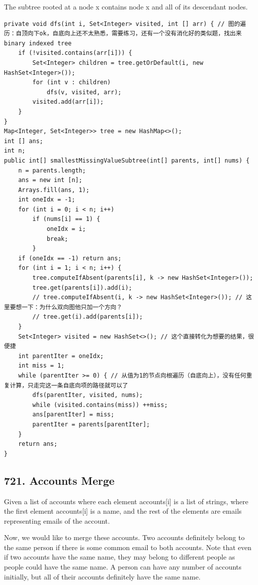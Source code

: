 \documentclass[9pt, b5paper]{article}
\begin{document}
The subtree rooted at a node x contains node x and all of its descendant nodes.
\begin{verbatim}
private void dfs(int i, Set<Integer> visited, int [] arr) { // 图的遍历：自顶向下ok，自底向上还不太熟悉，需要练习，还有一个没有消化好的类似题，找出来binary indexed tree
    if (!visited.contains(arr[i])) {
        Set<Integer> children = tree.getOrDefault(i, new HashSet<Integer>());
        for (int v : children) 
            dfs(v, visited, arr);
        visited.add(arr[i]);
    }
}
Map<Integer, Set<Integer>> tree = new HashMap<>();
int [] ans;
int n;
public int[] smallestMissingValueSubtree(int[] parents, int[] nums) {
    n = parents.length;
    ans = new int [n];
    Arrays.fill(ans, 1); 
    int oneIdx = -1;
    for (int i = 0; i < n; i++) 
        if (nums[i] == 1) {
            oneIdx = i;
            break;
        }
    if (oneIdx == -1) return ans;
    for (int i = 1; i < n; i++) {
        tree.computeIfAbsent(parents[i], k -> new HashSet<Integer>());
        tree.get(parents[i]).add(i);
        // tree.computeIfAbsent(i, k -> new HashSet<Integer>()); // 这里要想一下：为什么双向图他只加一个方向？
        // tree.get(i).add(parents[i]);
    }
    Set<Integer> visited = new HashSet<>(); // 这个直接转化为想要的结果，很便捷
    int parentIter = oneIdx;
    int miss = 1;
    while (parentIter >= 0) { // 从值为1的节点向根遍历（自底向上），没有任何重复计算，只走完这一条自底向项的路径就可以了
        dfs(parentIter, visited, nums);
        while (visited.contains(miss)) ++miss;
        ans[parentIter] = miss;
        parentIter = parents[parentIter];
    }
    return ans;
}
\end{verbatim}

\subsection{721. Accounts Merge}
\label{sec-11-3}
Given a list of accounts where each element accounts[i] is a list of strings, where the first element accounts[i]\footnotemark[3]{} is a name, and the rest of the elements are emails representing emails of the account.

Now, we would like to merge these accounts. Two accounts definitely belong to the same person if there is some common email to both accounts. Note that even if two accounts have the same name, they may belong to different people as people could have the same name. A person can have any number of accounts initially, but all of their accounts definitely have the same name.
\end{document}
